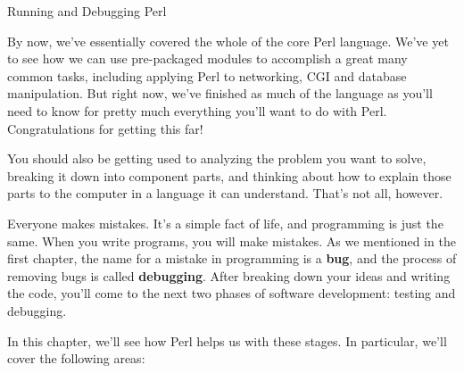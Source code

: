 \documentclass[a4paper,11pt]{book}
\begin{document}

\noindent 

\noindent 

\noindent 

\noindent 

\noindent 

\noindent 

\noindent 

\noindent 

\noindent 

\noindent 

\noindent 

\noindent 

\noindent 

\noindent 

\noindent 

\noindent Running and Debugging Perl

\noindent 

\noindent 

\noindent 

\noindent 

\noindent By now, we've essentially covered the whole of the core Perl language. We've yet to see how we can use pre-packaged modules to accomplish a great many common tasks, including applying Perl to networking, CGI and database manipulation. But right now, we've finished as much of the language as you'll need to know for pretty much everything you'll want to do with Perl. Congratulations for getting this far!

\noindent 

\noindent You should also be getting used to analyzing the problem you want to solve, breaking it down into component parts, and thinking about how to explain those parts to the computer in a language it can understand. That's not all, however.

\noindent 

\noindent Everyone makes mistakes. It's a simple fact of life, and programming is just the same. When you write programs, you will make mistakes. As we mentioned in the first chapter, the name for a mistake in programming is a \textbf{bug}, and the process of removing bugs is called \textbf{debugging}. After breaking down your ideas and writing the code, you'll come to the next two phases of software development: testing and debugging.

\noindent 

\noindent In this chapter, we'll see how Perl helps us with these stages. In particular, we'll cover the following areas:
\end{document}
